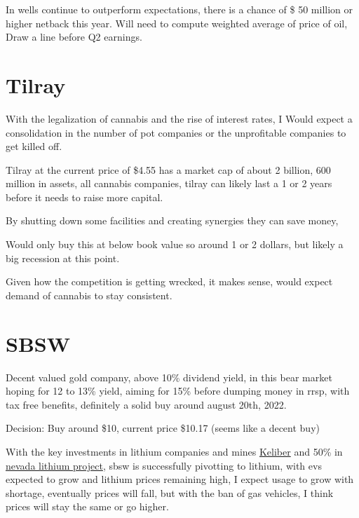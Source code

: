 In wells continue to outperform expectations, there is a chance of \$ 50 million or higher netback this year. Will need to compute weighted average of price of oil, Draw a line before Q2 earnings.


\section{Tilray}

With the legalization of cannabis and the rise of interest rates, I Would expect a consolidation in the number of pot companies or the unprofitable companies to get killed off.

Tilray at the current price of \$4.55 has a market cap of about 2 billion, 600 million in assets, all cannabis companies, tilray can likely last a 1 or 2 years before it needs to raise more capital.

By shutting down some facilities and creating synergies they can save money,

Would only buy this at below book value so around 1 or 2 dollars, but likely a big recession at this point.

Given how the competition is getting wrecked, it makes sense, would expect demand of cannabis to stay consistent.


\section{SBSW}

Decent valued gold company, above 10\% dividend yield, in this bear market hoping for 12 to 13\% yield, aiming for 15\% before dumping money in rrsp, with tax free benefits, definitely a solid buy around august 20th, 2022.

Decision: Buy around \$10, current price \$10.17 (seems like a decent buy)

With the key investments in lithium companies and mines \href{https://www.kitco.com/news/2022-06-30/Sibanye-Stillwater-to-achieve-majority-shareholding-in-lithium-developer-Keliber.html}{Keliber} and 50\% in \href{https://www.mining.com/sibanye-stillwater-grabs-50-of-nevada-lithium-project-for-490m/}{nevada lithium project}, sbsw is successfully pivotting to lithium, with evs expected to grow and lithium prices remaining high, I expect usage to grow with shortage, eventually prices will fall, but with the ban of gas vehicles, I think prices will stay the same or go higher.


